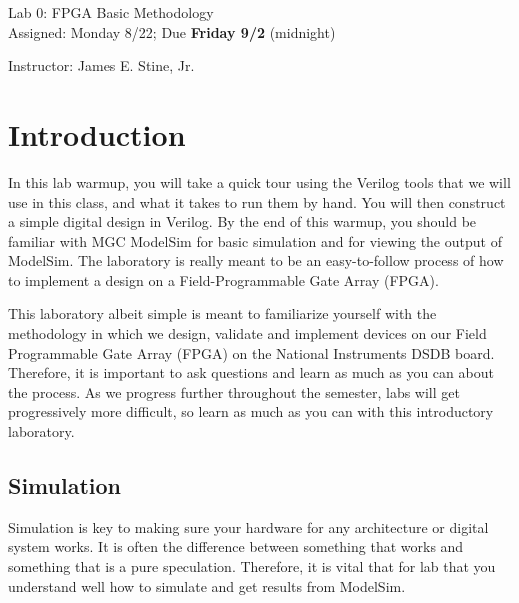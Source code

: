 \documentclass{article}
\newcommand{\myassignment}{Lab 0: FPGA Basic Methodology}
\newcommand{\myduedate}{Assigned: Monday 8/22; Due \textbf{Friday 9/2} (midnight)}
\newcommand{\myinstructor}{Instructor: James E. Stine, Jr.}
\begin{document}
\begin{center}
  {\huge \myassignment} \\
  {\large \myduedate} \\
  \begin{flushright}
  \myinstructor \\
  \end{flushright}
\end{center}

\section{Introduction}

In this lab warmup, you will take a quick tour using the 
Verilog tools that we will use
in this class, and what it takes to run them by hand. You will then
construct a simple digital design in Verilog.
By the end of this warmup, you should be
familiar with MGC ModelSim for basic simulation and for viewing the
output of ModelSim. The laboratory is really meant to be an
easy-to-follow process of how to implement a design on a
Field-Programmable Gate Array (FPGA).

This laboratory albeit simple
is meant to familiarize yourself with the methodology in which we
design, validate and implement devices on our Field Programmable Gate
Array (FPGA) on the National Instruments DSDB board.  Therefore, it is
important to ask questions and learn as much as you can about the
process.  As we progress further throughout the semester, labs will
get progressively more difficult, so learn as much as you can with
this introductory laboratory.

\subsection{Simulation}

Simulation is key to making sure your hardware for any architecture or
digital system works.  It is often the difference between something
that works and something that is a pure speculation.  Therefore, it is
vital that for lab that you understand well how to simulate and get
results from ModelSim.
\end{document}
